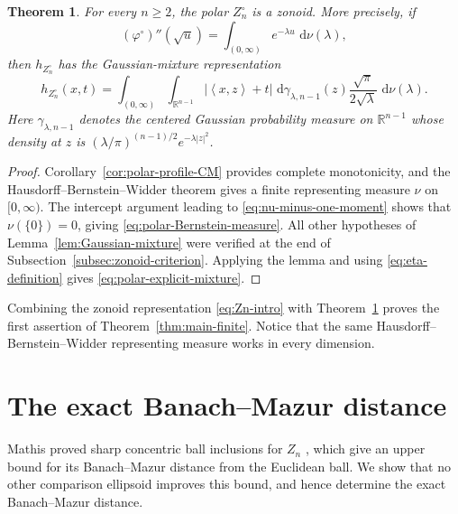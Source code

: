 \documentclass[11pt]{article}
\newtheorem{theorem}{Theorem}[section]
\theoremstyle{definition}
\theoremstyle{remark}
\newcommand{\R}{\mathbb R}
\newcommand{\dd}{\,\mathrm d}
\newcommand{\abs}[1]{\left|#1\right|}
\newcommand{\ip}[2]{\left\langle #1,#2\right\rangle}
\begin{document}
\begin{theorem}\label{thm:polar-is-zonoid}
For every $n\geq2$, the polar $Z_n^\circ$ is a zonoid.
More precisely, if
\begin{equation}\label{eq:polar-Bernstein-measure}
 (\varphi^\circ)''(\sqrt u)
 =\int_{(0,\infty)}e^{-\lambda u}\,\dd\nu(\lambda),
\end{equation}
then $h_{Z_n^\circ}$ has the  Gaussian-mixture representation
\begin{equation}\label{eq:polar-explicit-mixture}
 h_{Z_n^\circ}(x,t)
 =\int_{(0,\infty)}\int_{\R^{n-1}}
 \abs{\ip{x}{z}+t}\,
 \dd\gamma_{\lambda,n-1}(z)
 \frac{\sqrt\pi}{2\sqrt\lambda}\,\dd\nu(\lambda).
\end{equation}
Here $\gamma_{\lambda,n-1}$ denotes the centered Gaussian
probability measure on $\R^{n-1}$ whose density at $z$ is
$({\lambda}/{\pi})^{(n-1)/2}e^{-\lambda\abs{z}^2}$.
\end{theorem}

\begin{proof}
Corollary~\ref{cor:polar-profile-CM} provides
complete monotonicity, and the Hausdorff--Bernstein--Widder theorem
gives a finite representing measure $\nu$ on $[0,\infty)$.  The
intercept argument leading to \eqref{eq:nu-minus-one-moment} shows that
$\nu(\{0\})=0$, giving \eqref{eq:polar-Bernstein-measure}.  All other
hypotheses of Lemma~\ref{lem:Gaussian-mixture} were verified at the end
of Subsection~\ref{subsec:zonoid-criterion}.  Applying the lemma and
using \eqref{eq:eta-definition} gives
\eqref{eq:polar-explicit-mixture}.
\end{proof}

Combining the  zonoid representation
\eqref{eq:Zn-intro} with Theorem~\ref{thm:polar-is-zonoid} proves the
first assertion of Theorem~\ref{thm:main-finite}.  Notice that the same
Hausdorff--Bernstein--Widder representing measure works in every dimension.

\section{The exact Banach--Mazur distance}\label{sec:exact-BM}



Mathis proved sharp concentric ball inclusions for $Z_n$
\cite{Mathis2025}, which give an upper bound for its
Banach--Mazur distance from the Euclidean ball. We show that
no other comparison ellipsoid improves this bound, and hence
determine the exact Banach--Mazur distance.
\end{document}
